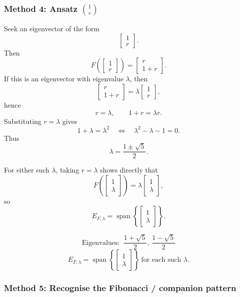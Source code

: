 \documentclass[12pt]{article}
\newcommand{\Span}{\operatorname{span}}
\begin{document}
\newpage
\subsubsection{Method 4: Ansatz $\binom{1}{r}$}

Seek an eigenvector of the form
\[
\begin{bmatrix}1\\r\end{bmatrix}.
\]
Then
\[
F\!\left(\begin{bmatrix}1\\r\end{bmatrix}\right)
=
\begin{bmatrix}r\\1+r\end{bmatrix}.
\]
If this is an eigenvector with eigenvalue $\lambda$, then
\[
\begin{bmatrix}r\\1+r\end{bmatrix}
=
\lambda\begin{bmatrix}1\\r\end{bmatrix},
\]
hence
\[
r=\lambda,\qquad 1+r=\lambda r.
\]
Substituting $r=\lambda$ gives
\[
1+\lambda=\lambda^2
\quad\Longleftrightarrow\quad
\lambda^2-\lambda-1=0.
\]
Thus
\[
\lambda=\frac{1\pm\sqrt5}{2}.
\]

For either such $\lambda$, taking $r=\lambda$ shows directly that
\[
F\!\left(\begin{bmatrix}1\\\lambda\end{bmatrix}\right)
=
\lambda\begin{bmatrix}1\\\lambda\end{bmatrix},
\]
so
\[
E_{F,\lambda}
=
\Span\left\{\begin{bmatrix}1\\\lambda\end{bmatrix}\right\}.
\]

\[
\boxed{\,\text{Eigenvalues: }\ \dfrac{1+\sqrt5}{2},\ \dfrac{1-\sqrt5}{2}\,}
\]
\[
\boxed{\,
E_{F,\lambda}
=
\Span\left\{\begin{bmatrix}1\\\lambda\end{bmatrix}\right\}
\ \text{for each such }\lambda.
\,}
\]

\newpage
\subsubsection{Method 5: Recognise the Fibonacci / companion pattern}
\end{document}
